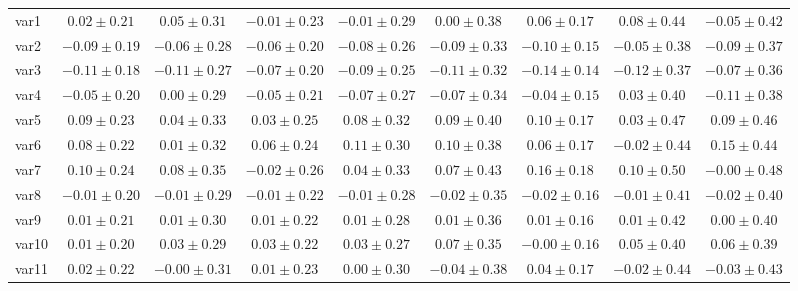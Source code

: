 \begin{table}
\begin{center}
\begin{tabular}{lcccccccc}
var1&$0.02\pm0.21$&$0.05\pm0.31$&$-0.01\pm0.23$&$-0.01\pm0.29$&$0.00\pm0.38$&$0.06\pm0.17$&$0.08\pm0.44$&$-0.05\pm0.42$\\
var2&$-0.09\pm0.19$&$-0.06\pm0.28$&$-0.06\pm0.20$&$-0.08\pm0.26$&$-0.09\pm0.33$&$-0.10\pm0.15$&$-0.05\pm0.38$&$-0.09\pm0.37$\\
var3&$-0.11\pm0.18$&$-0.11\pm0.27$&$-0.07\pm0.20$&$-0.09\pm0.25$&$-0.11\pm0.32$&$-0.14\pm0.14$&$-0.12\pm0.37$&$-0.07\pm0.36$\\
var4&$-0.05\pm0.20$&$0.00\pm0.29$&$-0.05\pm0.21$&$-0.07\pm0.27$&$-0.07\pm0.34$&$-0.04\pm0.15$&$0.03\pm0.40$&$-0.11\pm0.38$\\
var5&$0.09\pm0.23$&$0.04\pm0.33$&$0.03\pm0.25$&$0.08\pm0.32$&$0.09\pm0.40$&$0.10\pm0.17$&$0.03\pm0.47$&$0.09\pm0.46$\\
var6&$0.08\pm0.22$&$0.01\pm0.32$&$0.06\pm0.24$&$0.11\pm0.30$&$0.10\pm0.38$&$0.06\pm0.17$&$-0.02\pm0.44$&$0.15\pm0.44$\\
var7&$0.10\pm0.24$&$0.08\pm0.35$&$-0.02\pm0.26$&$0.04\pm0.33$&$0.07\pm0.43$&$0.16\pm0.18$&$0.10\pm0.50$&$-0.00\pm0.48$\\
var8&$-0.01\pm0.20$&$-0.01\pm0.29$&$-0.01\pm0.22$&$-0.01\pm0.28$&$-0.02\pm0.35$&$-0.02\pm0.16$&$-0.01\pm0.41$&$-0.02\pm0.40$\\
var9&$0.01\pm0.21$&$0.01\pm0.30$&$0.01\pm0.22$&$0.01\pm0.28$&$0.01\pm0.36$&$0.01\pm0.16$&$0.01\pm0.42$&$0.00\pm0.40$\\
var10&$0.01\pm0.20$&$0.03\pm0.29$&$0.03\pm0.22$&$0.03\pm0.27$&$0.07\pm0.35$&$-0.00\pm0.16$&$0.05\pm0.40$&$0.06\pm0.39$\\
var11&$0.02\pm0.22$&$-0.00\pm0.31$&$0.01\pm0.23$&$0.00\pm0.30$&$-0.04\pm0.38$&$0.04\pm0.17$&$-0.02\pm0.44$&$-0.03\pm0.43$\\
\hline\hline
\end{tabular}
\end{center}
\end{table}
